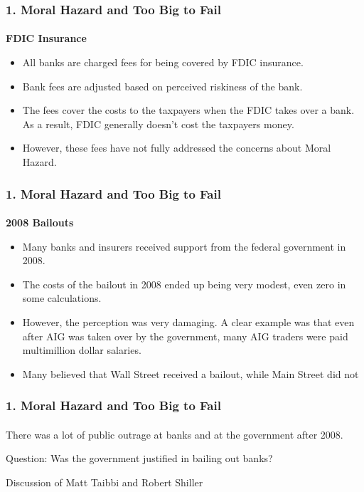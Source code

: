 \documentclass{beamer}
\begin{document}
\begin{frame}[t]
\frametitle{1. Moral Hazard and Too Big to Fail}
\framesubtitle{}

    \textbf{FDIC Insurance}
    
    \begin{itemize}
        \item All banks are charged fees for being covered by FDIC insurance.
        \item Bank fees are adjusted based on perceived riskiness of the bank.
        \item The fees cover the costs to the taxpayers when the FDIC takes over a bank.   As a result, FDIC generally doesn’t cost the taxpayers money.
        \item However, these fees have not fully addressed the concerns about Moral Hazard.
    \end{itemize}

\end{frame}

\begin{frame}[t]
\frametitle{1. Moral Hazard and Too Big to Fail}
\framesubtitle{}

    \textbf{2008 Bailouts}
    \begin{itemize}
        \item Many banks and insurers received support from the federal government in 2008.
        \item The costs of the bailout in 2008 ended up being very modest, even zero in some calculations.
        \item However, the perception was very damaging.   A clear example was that even after AIG was taken over by the government, many AIG traders were paid multimillion dollar salaries.
        \item Many believed that Wall Street received a bailout, while Main Street did not
    \end{itemize}

\end{frame}

\begin{frame}[t]
\frametitle{1. Moral Hazard and Too Big to Fail}
\framesubtitle{}

    There was a lot of public outrage at banks and at the government after 2008.  
    \vspace{1em}
    
    Question: Was the government justified in bailing out banks?
    \vspace{1em}
    
    Discussion of Matt Taibbi and Robert Shiller
    \vspace{1em}

\end{frame}
\end{document}
